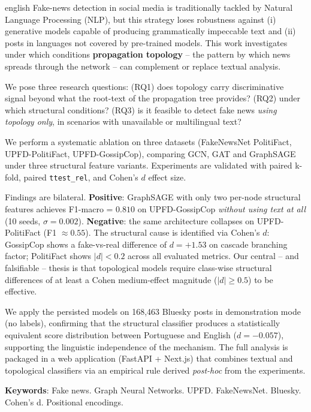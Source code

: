 \documentclass[12pt,oneside,a4paper]{abntex2}
\begin{document}
\begin{resumo}[Abstract]
\begin{otherlanguage*}{english}
Fake-news detection in social media is traditionally tackled by Natural
Language Processing (NLP), but this strategy loses robustness against
(i) generative models capable of producing grammatically impeccable text
and (ii) posts in languages not covered by pre-trained models. This work
investigates under which conditions \textbf{propagation topology} -- the
pattern by which news spreads through the network -- can complement or
replace textual analysis.

We pose three research questions: (RQ1) does topology carry discriminative
signal beyond what the root-text of the propagation tree provides? (RQ2)
under which structural conditions? (RQ3) is it feasible to detect fake news
\emph{using topology only}, in scenarios with unavailable or multilingual
text?

We perform a systematic ablation on three datasets (FakeNewsNet PolitiFact,
UPFD-PolitiFact, UPFD-GossipCop), comparing GCN, GAT and GraphSAGE under
three structural feature variants. Experiments are validated with paired
k-fold, paired \texttt{ttest\_rel}, and Cohen's $d$ effect size.

Findings are bilateral. \textbf{Positive}: GraphSAGE with only two
per-node structural features achieves F1-macro = $0{.}810$ on UPFD-GossipCop
\emph{without using text at all} (10 seeds, $\sigma = 0{.}002$).
\textbf{Negative}: the same architecture collapses on UPFD-PolitiFact
(F1 $\approx 0{.}55$). The structural cause is identified via Cohen's $d$:
GossipCop shows a fake-vs-real difference of $d = +1{.}53$ on cascade
branching factor; PolitiFact shows $|d| < 0{.}2$ across all evaluated
metrics. Our central -- and falsifiable -- thesis is that topological
models require class-wise structural differences of at least a Cohen
medium-effect magnitude ($|d| \geq 0{.}5$) to be effective.

We apply the persisted models on 168,463 Bluesky posts in demonstration
mode (no labels), confirming that the structural classifier produces a
statistically equivalent score distribution between Portuguese and English
($d = -0{.}057$), supporting the linguistic independence of the mechanism.
The full analysis is packaged in a web application (FastAPI + Next.js)
that combines textual and topological classifiers via an empirical rule
derived \emph{post-hoc} from the experiments.

\textbf{Keywords}: Fake news. Graph Neural Networks. UPFD. FakeNewsNet.
Bluesky. Cohen's d. Positional encodings.
\end{otherlanguage*}
\end{resumo}
\end{document}
